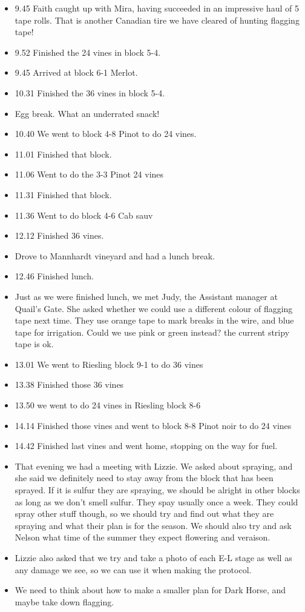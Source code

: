 \documentclass[11pt,letter]{article}
\newenvironment{smitemize}{
\begin{itemize}
  \setlength{\itemsep}{0pt}
  \setlength{\parskip}{0.8pt}
  \setlength{\parsep}{0pt}}
{\end{itemize}
}
\begin{document}
\begin{smitemize}
\item 9.45 Faith caught up with Mira, having succeeded in an impressive haul of 5 tape rolls. That is another Canadian tire we have cleared of hunting flagging tape!
\item 9.52 Finished the 24 vines in block 5-4.
\item 9.45 Arrived at block 6-1 Merlot.
\item 10.31 Finished the 36 vines in block 5-4.
\item Egg break. What an underrated snack!
\item 10.40 We went to block 4-8 Pinot to do 24 vines.
\item 11.01 Finished that block.
\item 11.06 Went to do the 3-3 Pinot 24 vines
\item 11.31 Finished that block. 
\item 11.36 Went to do block 4-6 Cab sauv
\item 12.12 Finished 36 vines. 
\item Drove to Mannhardt vineyard and had a lunch break.
\item 12.46 Finished lunch.
\item Just as we were finished lunch, we met Judy, the Assistant manager at Quail's Gate. She asked whether we could use a different colour of flagging tape next time. They use orange tape to mark breaks in the wire, and blue tape for irrigation. Could we use pink or green instead? the current stripy tape is ok. 
\item 13.01 We went to Riesling block 9-1 to do 36 vines
\item 13.38 Finished those 36 vines
\item 13.50 we went to do 24 vines in Riesling block 8-6
\item 14.14 Finished those vines and went to block 8-8 Pinot noir to do 24 vines
\item 14.42 Finished last vines and went home, stopping on the way for fuel.

\item That evening we had a meeting with Lizzie. We asked about spraying, and she said we definitely need to stay away from the block that has been sprayed. If it is sulfur they are spraying, we should be alright in other blocks as long as we don't smell sulfur. They spay usually once a week. They could spray other stuff though, so we should try and find out what they are spraying and what their plan is for the season. We should also try and ask Nelson what time of the summer they expect flowering and veraison. 
\item Lizzie also asked that we try and take a photo of each E-L stage as well as any damage we see, so we can use it when making the protocol.
\item We need to think about how to make a smaller plan for Dark Horse, and maybe take down flagging.

\end{smitemize}
\end{document}
